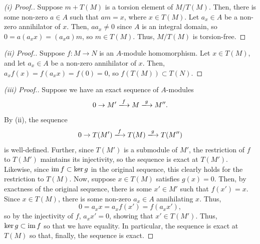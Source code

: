 \begin{proof}[(i) Proof.]
Suppose $m + T(M)$ is a torsion element of $M/T(M)$. Then, there is some non-zero $a \in A$ such that $a m = x$, where $x \in T(M)$. Let $a_x \in A$ be a non-zero annihilator of $x$.
Then, $a a_x \neq 0$ since $A$ is an integral domain, so $0 = a (a_x x) = (a_x a) m$, so $m \in T(M)$. Thus, $M / T(M)$ is torsion-free.
\end{proof}

\begin{proof}[(ii) Proof.]
Suppose $f : M \to N$ is an $A$-module homomorphism. Let $x \in T(M)$, and let $a_x \in A$ be a non-zero annihilator of $x$. Then, $a_x f(x) = f(a_x x) = f(0) = 0$,
so $f(T(M)) \subset T(N)$.
\end{proof}

\begin{proof}[(iii) Proof.]
Suppose we have an exact sequence of $A$-modules
$$0 \to M' \xlongrightarrow{f} M \xlongrightarrow{g} M''.$$
By (ii), the sequence
$$0 \to T(M') \xlongrightarrow{f} T(M) \xlongrightarrow{g} T(M'')$$
is well-defined. Further, since $T(M')$ is a submodule of $M'$, the restriction of $f$ to $T(M')$ maintains its injectivity, so the sequence is exact at $T(M')$. Likewise, since 
$\operatorname{im} f \subset \ker g$ in the original sequence, this clearly holds for the restriction to $T(M)$. Now, suppose $x \in T(M)$ satisfies $g(x) = 0$. Then, by exactness of the original
sequence, there is some $x' \in M'$ such that $f(x') = x$. Since $x \in T(M)$, there is some non-zero $a_x \in A$ annihilating $x$. Thus,
$$0 = a_x x = a_x f(x') = f(a_x x'),$$
so by the injectivity of $f$, $a_x x' = 0$, showing that $x' \in T(M')$. Thus, $\ker g \subset \operatorname{im} f$ so that we have equality. In particular, the sequence is exact at $T(M)$ so that, finally,
the sequence is exact.
\end{proof}

